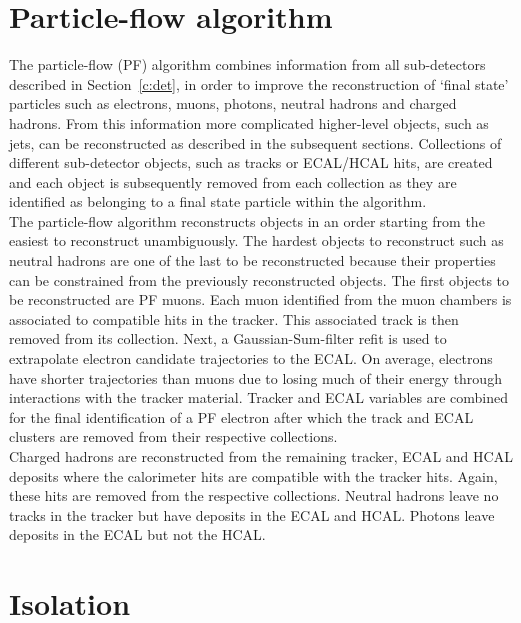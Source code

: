 \section{Particle-flow algorithm ~\label{sec:PF}}

The particle-flow (PF) algorithm combines information from all sub-detectors described in Section~\ref{c:det}, in order to improve the reconstruction of `final state' particles such as electrons, muons, photons, neutral hadrons and charged hadrons. From this information more complicated higher-level objects, such as jets, can be reconstructed as described in the subsequent sections. Collections of different sub-detector objects, such as tracks or ECAL/HCAL hits, are created and each object is subsequently removed from each collection as they are identified as belonging to a final state particle within the algorithm.\\
The particle-flow algorithm reconstructs objects in an order starting from the easiest to reconstruct unambiguously. The hardest objects to reconstruct such as neutral hadrons are one of the last to be reconstructed because their properties can be constrained from the previously reconstructed objects.
The first objects to be reconstructed are PF muons. Each muon identified from the muon chambers is associated to compatible hits in the tracker. This associated track is then removed from its collection. Next, a Gaussian-Sum-filter refit is used to extrapolate electron candidate trajectories to the ECAL. On average, electrons have shorter trajectories than muons due to losing much of their energy through interactions with the tracker material. Tracker and ECAL variables are combined for the final identification of a PF electron after which the track and ECAL clusters are removed from their respective collections.\\
Charged hadrons are reconstructed from the remaining tracker, ECAL and HCAL deposits where the calorimeter hits are compatible with the tracker hits. Again, these hits are removed from the respective collections. Neutral hadrons leave no tracks in the tracker but have deposits in the ECAL and HCAL. Photons leave deposits in the ECAL but not the HCAL.\\


\section{Isolation \label{sec:isolation}}

